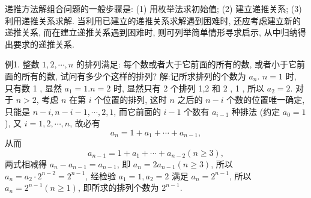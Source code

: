 
递推方法解组合问题的一般步骤是:
(1) 用枚举法求初始值;
(2) 建立递推关系;
(3) 利用递推关系求解.
当利用已建立的递推关系求解遇到困难时, 还应考虑建立新的递推关系, 而在建立递推关系遇到困难时, 则可列举简单情形寻求启示, 从中归纳得出要求的递推关系.



例1. 整数 $1,2, \cdots, n$ 的排列满足: 每个数或者大于它前面的所有的数, 或者小于它前面的所有的数, 试问有多少个这样的排列?
解:记所求排列的个数为 $a_n$.
$n=1$ 时, 只有数 1 , 显然 $a_1=1 . n=2$ 时, 显然只有 2 个排列 1,2 和 2 , 1 , 所以 $a_2=2$.
对于 $n>2$, 考虑 $n$ 在第 $i$ 个位置的排列, 这时 $n$ 之后的 $n-i$ 个数的位置唯一确定, 只能是 $n-i, n-i-1, \cdots, 2,1$, 而它前面的 $i-1$ 个数有 $a_{i-1}$ 种排法 (约定 $a_0=1$ ), 又 $i=1,2, \cdots, n$, 故必有
$$
a_n=1+a_1+\cdots+a_{n-1},
$$
从而
$$
a_{n-1}=1+a_1+\cdots+a_{n-2}(n \geqslant 3),
$$
两式相减得 $a_n-a_{n-1}=a_{n-1}$, 即 $a_n=2 a_{n-1}(n \geqslant 3)$, 所以 $a_n=a_2 \cdot 2^{n-2}=2^{n-1}$, 经检验 $a_1=1, a_2=2$ 满足 $a_n=2^{n-1}$, 所以 $a_n=2^{n-1}(n \geqslant 1)$, 即所求的排列个数为 $2^{n-1}$.




